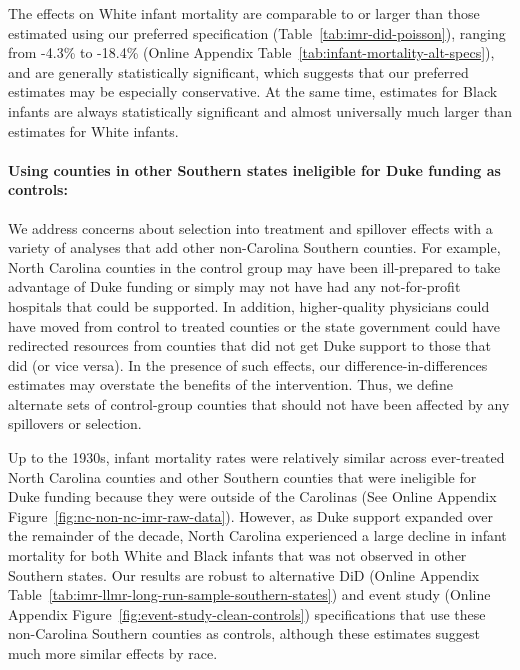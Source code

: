 \documentclass[12pt]{article}
\begin{document}
The effects on White infant mortality are comparable to or larger than those estimated using our preferred specification (Table~\ref{tab:imr-did-poisson}), ranging from  -4.3\% to -18.4\% (Online Appendix Table~\ref{tab:infant-mortality-alt-specs}), and are generally statistically significant, which suggests that our preferred estimates may be especially conservative. 
At the same time, estimates for Black infants are always statistically significant and almost universally much larger than estimates for White infants. 


\paragraph{Using counties in other Southern states ineligible for Duke funding as controls:}

We address concerns about selection into treatment and spillover effects with a variety of analyses that add other non-Carolina Southern counties. 
For example, North Carolina counties in the control group may have been ill-prepared to take advantage of Duke funding or simply may not have had any not-for-profit hospitals that could be supported.
In addition, higher-quality physicians could have moved from control to treated counties or the state government could have redirected resources from counties that did not get Duke support to those that did (or vice versa). 
In the presence of such effects, our difference-in-differences estimates may overstate the benefits of the intervention. 
Thus, we define alternate sets of control-group counties that should not have been affected by any spillovers or selection. 

Up to the 1930s, infant mortality rates were relatively similar across ever-treated North Carolina counties and other Southern counties that were ineligible for Duke funding because they were outside of the Carolinas (See Online Appendix Figure~\ref{fig:nc-non-nc-imr-raw-data}).  
However, as Duke support expanded over the remainder of the decade, North Carolina experienced a large decline in infant mortality for both White and Black infants that was not observed in other Southern states. 
Our results are robust to alternative DiD (Online Appendix Table~\ref{tab:imr-llmr-long-run-sample-southern-states}) and event study (Online Appendix Figure~\ref{fig:event-study-clean-controls}) specifications that use these non-Carolina Southern counties as controls, although these estimates suggest much more similar effects by race. 
\end{document}
